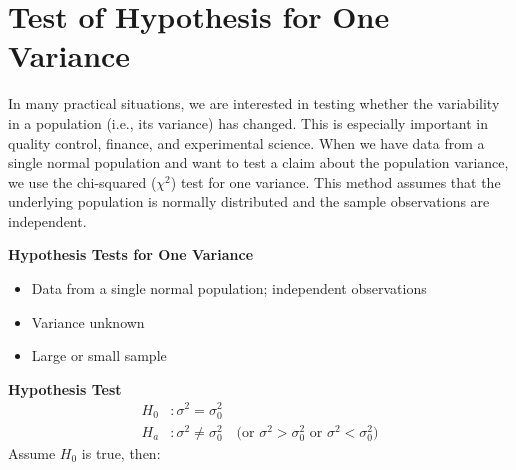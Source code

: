 \section*{Test of Hypothesis for One Variance}

In many practical situations, we are interested in testing whether the variability in a population (i.e., its variance) has changed. This is especially important in quality control, finance, and experimental science. When we have data from a single normal population and want to test a claim about the population variance, we use the chi-squared ($\chi^2$) test for one variance. This method assumes that the underlying population is normally distributed and the sample observations are independent.

\vspace{1em}
\textbf{Hypothesis Tests for One Variance}

\begin{itemize}
  \item Data from a single normal population; independent observations
  \item Variance unknown
  \item Large or small sample
\end{itemize}

\textbf{Hypothesis Test} \\
\begin{align*}
H_0 &: \sigma^2 = \sigma_0^2 \\
H_a &: \sigma^2 \ne \sigma_0^2 \quad \text{(or } \sigma^2 > \sigma_0^2 \text{ or } \sigma^2 < \sigma_0^2\text{)}
\end{align*}
Assume $H_0$ is true, then:

